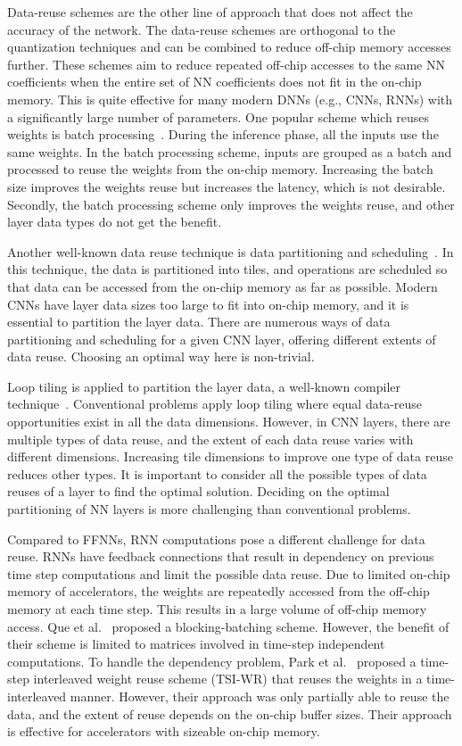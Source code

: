 Data-reuse schemes are the other line of approach that does not affect the accuracy of the network. The data-reuse schemes are orthogonal to the quantization techniques and can be combined to reduce off-chip memory accesses further. These schemes aim to reduce repeated off-chip accesses to the same NN coefficients when the entire set of NN coefficients does not fit in the on-chip memory. This is quite effective for many modern DNNs (e.g., CNNs, RNNs) with a significantly large number of parameters. One popular scheme which reuses weights is batch processing~\cite{zhang2015optimizing,Li2018SmartShuttleOO,que2019efficient}. During the inference phase, all the inputs use the same weights. In the batch processing scheme, inputs are grouped as a batch and processed to reuse the weights from the on-chip memory. Increasing the batch size improves the weights reuse but increases the latency, which is not desirable. Secondly, the batch processing scheme only improves the weights reuse, and other layer data types do not get the benefit.

Another well-known data reuse technique is data partitioning and scheduling~\cite{zhang2015optimizing, Li2018SmartShuttleOO}. In this technique, the data is partitioned into tiles, and operations are scheduled so that data can be accessed from the on-chip memory as far as possible. Modern CNNs have layer data sizes too large to fit into on-chip memory, and it is essential to partition the layer data. There are numerous ways of data partitioning and scheduling for a given CNN layer, offering different extents of data reuse. Choosing an optimal way here is non-trivial.

Loop tiling is applied to partition the layer data, a well-known compiler technique~\cite{aho2006compilers}. Conventional problems apply loop tiling where equal data-reuse opportunities exist in all the data dimensions. However, in CNN layers, there are multiple types of data reuse, and the extent of each data reuse varies with different dimensions. Increasing tile dimensions to improve one type of data reuse reduces other types. It is important to consider all the possible types of data reuses of a layer to find the optimal solution. Deciding on the optimal partitioning of NN layers is more challenging than conventional problems.

Compared to FFNNs, RNN computations pose a different challenge for data reuse. RNNs have feedback connections that result in dependency on previous time step computations and limit the possible data reuse. Due to limited on-chip memory of accelerators, the weights are repeatedly accessed from the off-chip memory at each time step. This results in a large volume of off-chip memory access. Que et al.~\cite{que2019efficient} proposed a blocking-batching scheme. However, the benefit of their scheme is limited to matrices involved in time-step independent computations. To handle the dependency problem, Park et al.~\cite{park2020time} proposed a time-step interleaved weight reuse scheme (TSI-WR) that reuses the weights in a time-interleaved manner. However, their approach was only partially able to reuse the data, and the extent of reuse depends on the on-chip buffer sizes. Their approach is effective for accelerators with sizeable on-chip memory.
